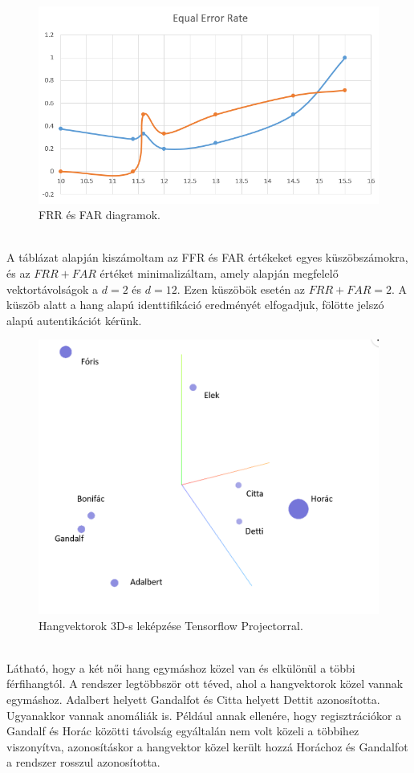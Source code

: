 \begin{figure}[!ht]
	\centering
	\includegraphics[width=120mm, keepaspectratio]{figures/test-eer.png}
	\caption{FRR és FAR diagramok.}
	\label{fig:test-eer}
\end{figure}
\ \\
A táblázat alapján kiszámoltam az FFR és FAR értékeket egyes küszöbszámokra, és az $FRR + FAR$ értéket minimalizáltam, amely alapján megfelelő vektortávolságok a $d = 2$ és $d = 12$. Ezen küszöbök esetén az $FRR + FAR = 2$. A küszöb alatt a hang alapú identtifikáció eredményét elfogadjuk, fölötte jelszó alapú autentikációt kérünk.

\begin{figure}[!ht]
	\centering
	\includegraphics[width=120mm, keepaspectratio]{figures/speaker-projection.png}
	\caption{Hangvektorok 3D-s leképzése Tensorflow Projectorral.}
	\label{fig:speaker-projection}
\end{figure}
\ \\
Látható, hogy a két női hang egymáshoz közel van és elkülönül a többi férfihangtól. A rendszer legtöbbször ott téved, ahol a hangvektorok közel vannak egymáshoz. Adalbert helyett Gandalfot és Citta helyett Dettit azonosította. Ugyanakkor vannak anomáliák is. Például annak ellenére, hogy regisztrációkor a Gandalf és Horác közötti távolság egyáltalán nem volt közeli a többihez viszonyítva, azonosításkor a hangvektor közel került hozzá Horáchoz és Gandalfot a rendszer rosszul azonosította.

